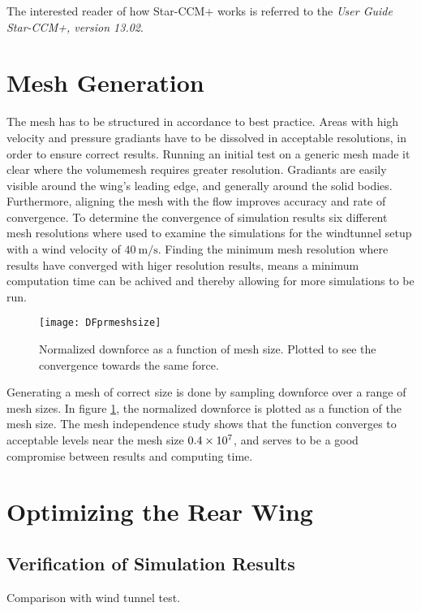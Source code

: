   The interested reader of how Star-CCM+ works is referred to the \emph{User Guide Star-CCM+, version 13.02}.

\section{Mesh Generation}
  The mesh has to be structured in accordance to best practice. Areas with high velocity and pressure gradiants have to be dissolved in acceptable resolutions, in order to ensure correct results. Running an initial test on a generic mesh made it clear where the volumemesh requires greater resolution. Gradiants are easily visible around the wing's leading edge, and generally around the solid bodies. Furthermore, aligning the mesh with the flow improves accuracy and rate of convergence. To determine the convergence of simulation results six different mesh resolutions where used to examine the simulations for the windtunnel setup with a wind velocity of $\SI{40}{\metre\per\second}$. Finding the minimum mesh resolution where results have converged with higer resolution results, means a minimum computation time can be achived and thereby allowing for more simulations to be run.

  \begin{figure}
    \texttt{[image: DFprmeshsize]}
    \label{fig:DFprmeshsize}
    \caption{Normalized downforce as a function of mesh size. Plotted to see the convergence towards the same force.}
  \end{figure}

  Generating a mesh of correct size is done by sampling downforce over a range of mesh sizes. In figure \ref{fig:DFprmeshsize}, the normalized downforce is plotted as a function of the mesh size. The mesh independence study shows that the function converges to acceptable levels near the mesh size $\SI{.4E7}{}$, and serves to be a good compromise between results and computing time.

\section{Optimizing the Rear Wing}


  \subsection{Verification of Simulation Results}
  \label{sec:simulationcomparison}

  Comparison with wind tunnel test.

